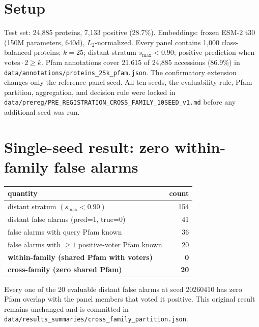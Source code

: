 \documentclass[11pt]{article}
\begin{document}
\section{Setup}
Test set: 24{,}885 proteins, 7{,}133 positive (28.7\%). Embeddings: frozen ESM-2 t30 (150M parameters, 640d), $L_2$-normalized. Every panel contains 1{,}000 class-balanced proteins; $k=25$; distant stratum $s_{\max}<0.90$; positive prediction when $\text{votes}\cdot 2 \ge k$. Pfam annotations cover 21{,}615 of 24{,}885 accessions (86.9\%) in \texttt{data/annotations/proteins\_25k\_pfam.json}. The confirmatory extension changes only the reference-panel seed. All ten seeds, the evaluability rule, Pfam partition, aggregation, and decision rule were locked in \texttt{data/prereg/PRE\_REGISTRATION\_CROSS\_FAMILY\_10SEED\_v1.md} before any additional seed was run.

\section{Single-seed result: zero within-family false alarms}
\begin{center}
\begin{tabular}{lr}
\toprule
quantity & count \\
\midrule
distant stratum $(s_{\max}<0.90)$ & 154 \\
distant false alarms (pred=1, true=0) & 41 \\
false alarms with query Pfam known & 36 \\
false alarms with $\ge 1$ positive-voter Pfam known & 20 \\
\textbf{within-family (shared Pfam with voters)} & \textbf{0} \\
\textbf{cross-family (zero shared Pfam)} & \textbf{20} \\
\bottomrule
\end{tabular}
\end{center}

Every one of the 20 evaluable distant false alarms at seed 20260410 has zero Pfam overlap with the panel members that voted it positive. This original result remains unchanged and is committed in \texttt{data/results\_summaries/cross\_family\_partition.json}.
\end{document}
